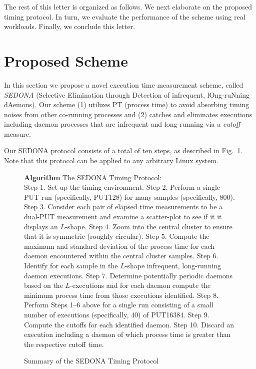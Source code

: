 \documentclass[letter]{ieice}
\begin{document}
\noindent
The rest of this letter is organized as follows. 
{\color{blue}We next elaborate on the proposed timing protocol. 
In turn, we evaluate the performance of the scheme using real workloads. 
Finally, we conclude this letter.}


\section{Proposed Scheme}
\label{sec:prop_appach}

In this section we propose a novel execution time measurement scheme, 
called {\em SEDONA} (Selective Elimination through Detection of infrequent, lOng-ruNning dAemons). {\color{blue} Our scheme (1) utilizes PT (process time) to avoid absorbing timing noises from other co-running processes and (2) catches and eliminates executions including daemon processes that are infrequent and \hbox{long-running} via a {\em cutoff} measure. 
}

Our SEDONA protocol consists of a total of ten steps, as described in Fig.~\ref{alg:find}. 
{\color{blue}Note that this protocol can be applied to any arbitrary Linux system.}

\begin{figure}[h]
\begin{center}
\begin{algorithmic}
{\bf Algorithm} The SEDONA Timing Protocol: \\
\STATE Step 1. Set up the timing environment.
\STATE Step 2. Perform a single PUT run (specifically, PUT128) for many samples (specifically, 800).
\STATE Step 3. Consider each pair of elapsed time measurements to be a dual-PUT measurement 
and examine a scatter-plot to see if it it displays an $L$-shape.
\STATE Step 4. Zoom into the central cluster to ensure that it is symmetric (roughly circular).
\STATE Step 5. Compute the maximum and standard deviation of the process time 
for each daemon encountered within the central cluster samples.
\STATE Step 6. Identify for each sample in the $L$-shape infrequent, long-running daemon executions. 
\STATE Step 7. Determine potentially periodic daemons based on the $L$-executions 
and for each daemon compute the minimum process time from those executions identified. 
\STATE Step 8. Perform Steps 1--6 above for a single run 
consisting of a small number of executions (specifically, 40) of PUT16384.  
\STATE Step 9. Compute the cutoffs for each identified daemon. 
\STATE Step 10. Discard an execution including a daemon of which process time is greater than the respective cutoff time.
\end{algorithmic}
\end{center}
\caption{Summary of the SEDONA Timing Protocol\label{alg:find}}
\vspace{-0.25in}
\end{figure}
\end{document}
